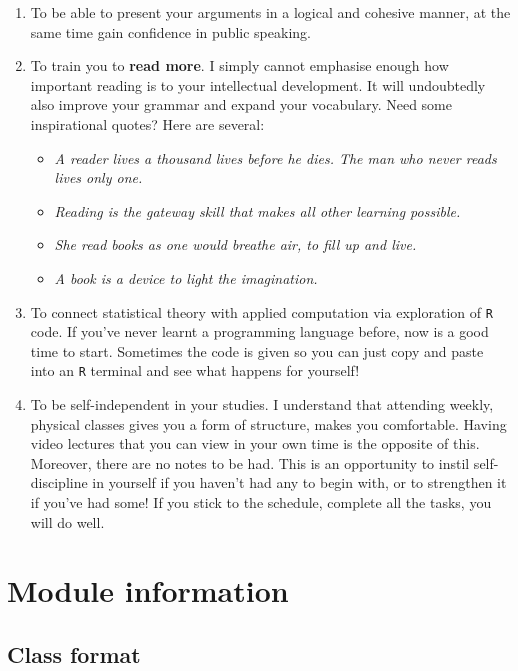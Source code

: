 \documentclass[
]{book}
\providecommand{\tightlist}{%
  \setlength{\itemsep}{0pt}\setlength{\parskip}{0pt}}
\theoremstyle{definition}
\theoremstyle{definition}
\theoremstyle{definition}
\theoremstyle{definition}
\theoremstyle{remark}
\begin{document}
\begin{enumerate}
\def\labelenumi{\arabic{enumi}.}
\item
  To be able to present your arguments in a logical and cohesive manner, at the same time gain confidence in public speaking.
\item
  To train you to \textbf{read more}. I simply cannot emphasise enough how important reading is to your intellectual development. It will undoubtedly also improve your grammar and expand your vocabulary. Need some inspirational quotes? Here are several:

  \begin{itemize}
  \tightlist
  \item
    \emph{A reader lives a thousand lives before he dies. The man who never reads lives only one.}
  \item
    \emph{Reading is the gateway skill that makes all other learning possible.}
  \item
    \emph{She read books as one would breathe air, to fill up and live.}
  \item
    \emph{A book is a device to light the imagination.}
  \end{itemize}
\item
  To connect statistical theory with applied computation via exploration of \texttt{R} code. If you've never learnt a programming language before, now is a good time to start. Sometimes the code is given so you can just copy and paste into an \texttt{R} terminal and see what happens for yourself!
\item
  To be self-independent in your studies. I understand that attending weekly, physical classes gives you a form of structure, makes you comfortable. Having video lectures that you can view in your own time is the opposite of this. Moreover, there are no notes to be had. This is an opportunity to instil self-discipline in yourself if you haven't had any to begin with, or to strengthen it if you've had some! If you stick to the schedule, complete all the tasks, you will do well.
\end{enumerate}

\hypertarget{module-information}{%
\section*{Module information}\label{module-information}}

\hypertarget{class-format}{%
\subsection*{Class format}\label{class-format}}
\end{document}
